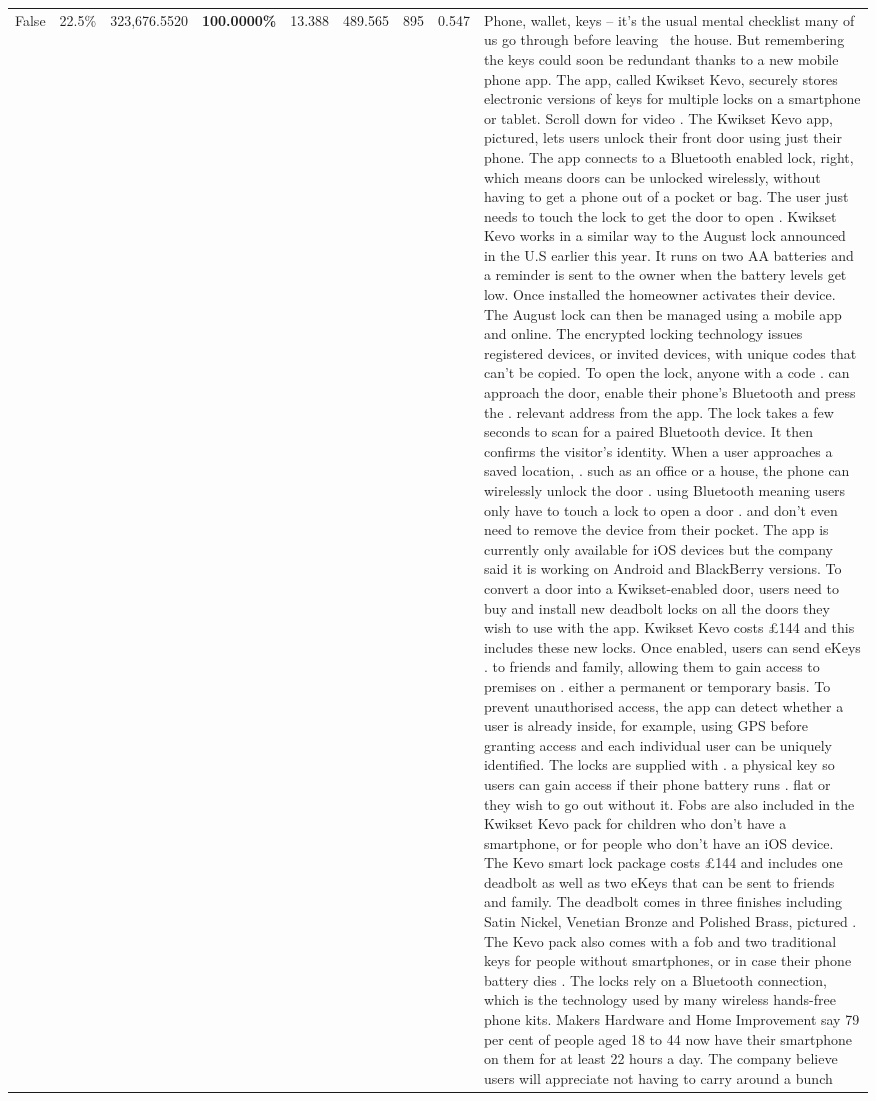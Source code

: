 \begin{table}[H]
\begin{tabular}{lllrlllll}
False & 22.5\% & 323,676.5520 & \bfseries \color{red} 100.0000\% & 13.388 & 489.565 & 895 & 0.547 & Phone, wallet, keys – it’s the usual mental checklist many of us go through before leaving  the house. But remembering the keys could soon be redundant thanks to a new mobile phone app. The app, called Kwikset Kevo, securely stores electronic versions of keys for multiple locks on a smartphone or tablet. Scroll down for video . The Kwikset Kevo app, pictured, lets users unlock their front door using just their phone. The app connects to a Bluetooth enabled lock, right, which means doors can be unlocked wirelessly, without having to get a phone out of a pocket or bag. The user just needs to touch the lock to get the door to open . Kwikset Kevo works in a similar way to the August lock announced in the U.S earlier this year. It runs on two AA batteries and a reminder is sent to the owner when the battery levels get low. Once installed the homeowner activates their device. The August lock can then be managed using a mobile app and online. The encrypted locking technology issues registered devices, or invited devices, with unique codes that can't be copied. To open the lock, anyone with a code . can approach the door, enable their phone's Bluetooth and press the . relevant address from the app. The lock takes a few seconds to scan for a paired Bluetooth device. It then confirms the visitor's identity. When a user approaches a saved location, . such as an office or a house, the phone can wirelessly unlock the door . using Bluetooth meaning users only have to touch a lock to open a door . and don't even need to remove the device from their pocket. The app is currently only available for iOS devices but the company said it is working on Android and BlackBerry versions. To convert a door into a Kwikset-enabled door, users need to buy and install new deadbolt locks on all the doors they wish to use with the app. Kwikset Kevo costs £144 and this includes these new locks. Once enabled, users can send eKeys . to friends and family, allowing them to gain access to premises on . either a permanent or temporary basis. To prevent unauthorised access, the app can detect whether a user is already inside, for example, using GPS before granting access and each individual user can be uniquely identified. The locks are supplied with . a physical key so users can gain access if their phone battery runs . flat or they wish to go out without it. Fobs are also included in the Kwikset Kevo pack for children who don't have a smartphone, or for people who don't have an iOS device. The Kevo smart lock package costs £144 and includes one deadbolt as well as two eKeys that can be sent to friends and family. The deadbolt comes in three finishes including Satin Nickel, Venetian Bronze and Polished Brass, pictured . The Kevo pack also comes with a fob and two traditional keys for people without smartphones, or in case their phone battery dies . The locks rely on a Bluetooth connection, which is the technology used by many wireless hands-free phone kits. Makers Hardware and Home Improvement say 79 per cent of people aged 18 to 44 now have their smartphone on them for at least 22 hours a day. The company believe users will appreciate not having to carry around a bunch 
\end{tabular}
\end{table}
